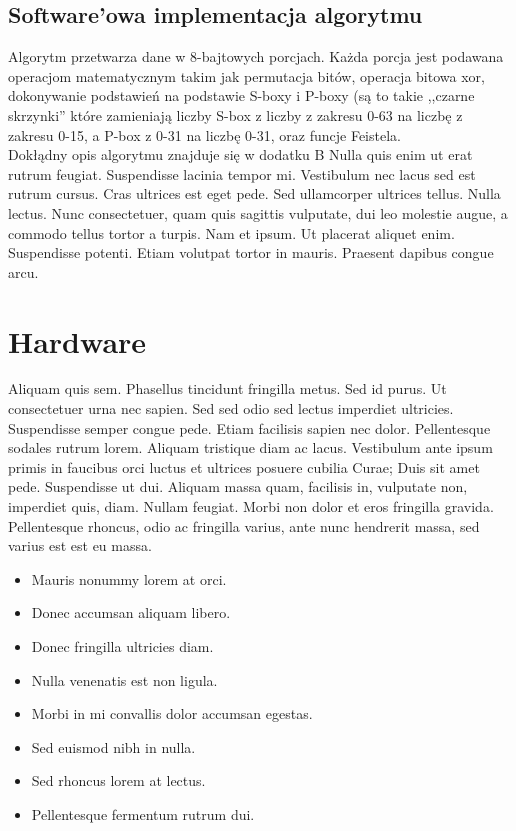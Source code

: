 \documentclass[oneside]{mgr}
\begin{document}
\subsection{Software'owa implementacja algorytmu}
Algorytm przetwarza dane w 8-bajtowych porcjach. Każda porcja jest podawana operacjom matematycznym takim jak permutacja bitów, operacja bitowa xor, dokonywanie podstawień na podstawie S-boxy i P-boxy (są to takie ,,czarne skrzynki'' które zamieniają liczby S-box z liczby z zakresu 0-63 na liczbę z zakresu 0-15, a P-box z 0-31 na liczbę 0-31, oraz funcje Feistela.\\Dokłądny opis algorytmu znajduje się w dodatku B
Nulla quis enim ut erat rutrum feugiat. Suspendisse lacinia tempor
mi. Vestibulum nec lacus sed est rutrum cursus. Cras ultrices est eget
pede. Sed ullamcorper ultrices tellus. Nulla lectus. Nunc
consectetuer, quam quis sagittis vulputate, dui leo molestie augue, a
commodo tellus tortor a turpis. Nam et ipsum. Ut placerat aliquet
enim. Suspendisse potenti. Etiam volutpat tortor in mauris. Praesent
dapibus congue arcu.

\section{Hardware}
Aliquam quis sem. Phasellus tincidunt fringilla metus. Sed id
purus. Ut consectetuer urna nec sapien. Sed sed odio sed lectus
imperdiet ultricies. Suspendisse semper congue pede. Etiam facilisis
sapien nec dolor. Pellentesque sodales rutrum lorem. Aliquam tristique
diam ac lacus. Vestibulum ante ipsum primis in faucibus orci luctus et
ultrices posuere cubilia Curae; Duis sit amet pede. Suspendisse ut
dui. Aliquam massa quam, facilisis in, vulputate non, imperdiet quis,
diam. Nullam feugiat. Morbi non dolor et eros fringilla
gravida. Pellentesque rhoncus, odio ac fringilla varius, ante nunc
hendrerit massa, sed varius est est eu massa.


\begin{itemize}
\item Mauris nonummy lorem at orci.
\item Donec accumsan aliquam libero.
\item Donec fringilla ultricies diam.
\item Nulla venenatis est non ligula.
\item Morbi in mi convallis dolor accumsan egestas.
\item Sed euismod nibh in nulla.
\item Sed rhoncus lorem at lectus.
\item Pellentesque fermentum rutrum dui.
\end{itemize}
\end{document}
